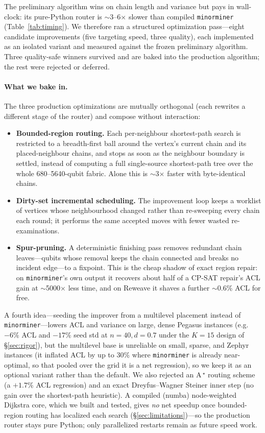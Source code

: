 \documentclass[acmsmall,anonymous,nonacm]{acmart}
\begin{document}
The preliminary algorithm wins on chain length and variance but pays in
wall-clock: its pure-Python router is $\sim$3--6$\times$ slower than compiled
\texttt{minorminer} (Table~\ref{tab:timing}). We therefore ran a structured
optimization pass---eight candidate improvements (five targeting speed, three
quality), each implemented as an isolated variant and measured against the frozen
preliminary algorithm. Three quality-safe winners survived and are baked into the
production algorithm; the rest were rejected or deferred.

\paragraph{What we bake in.} The three production optimizations are mutually
orthogonal (each rewrites a different stage of the router) and compose without
interaction:
\begin{itemize}
  \item \textbf{Bounded-region routing.} Each per-neighbour shortest-path search
    is restricted to a breadth-first ball around the vertex's current chain and
    its placed-neighbour chains, and stops as soon as the neighbour boundary is
    settled, instead of computing a full single-source shortest-path tree over
    the whole 680--5640-qubit fabric. Alone this is $\sim$3$\times$ faster with
    byte-identical chains.
  \item \textbf{Dirty-set incremental scheduling.} The improvement loop keeps a
    worklist of vertices whose neighbourhood changed rather than re-sweeping
    every chain each round; it performs the same accepted moves with fewer
    wasted re-examinations.
  \item \textbf{Spur-pruning.} A deterministic finishing pass removes redundant
    chain leaves---qubits whose removal keeps the chain connected and breaks no
    incident edge---to a fixpoint. This is the cheap shadow of exact region
    repair: on \texttt{minorminer}'s own output it recovers about half of a
    CP-SAT repair's ACL gain at $\sim$5000$\times$ less time, and on Reweave it
    shaves a further ${\sim}0.6\%$ ACL for free.
\end{itemize}
A fourth idea---seeding the improver from a multilevel placement instead of
\texttt{minorminer}---lowers ACL and variance on large, dense Pegasus instances
(e.g.\ $-6\%$ ACL and $-17\%$ seed std at $n{=}40,d{=}0.7$ under the $K{=}15$ design
of \S\ref{sec:rigor}), but the multilevel base is unreliable on small, sparse, and
Zephyr instances (it inflated ACL by up to $30\%$ where \texttt{minorminer} is already
near-optimal, so that pooled over the grid it is a net regression), so we keep it as
an optional variant rather than the default. We also rejected an A\,$^\star$ routing
scheme (a $+1.7\%$ ACL regression) and an exact Dreyfus--Wagner Steiner inner step
(no gain over the shortest-path heuristic). A compiled (numba) node-weighted
Dijkstra core, which we built and tested, gives \emph{no} net speedup once
bounded-region routing has localized each search
(\S\ref{sec:limitations})---so the production router stays pure Python; only
parallelized restarts remain as future speed work.
\end{document}
